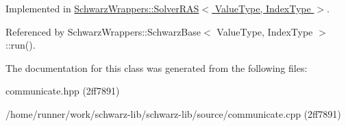 Implemented in \hyperlink{classSchwarzWrappers_1_1SolverRAS_a1a741b69e1cd7623c6e2d8467aedaa7c}{Schwarz\+Wrappers\+::\+Solver\+R\+A\+S$<$ Value\+Type, Index\+Type $>$}.



Referenced by Schwarz\+Wrappers\+::\+Schwarz\+Base$<$ Value\+Type, Index\+Type $>$\+::run().



The documentation for this class was generated from the following files\+:\begin{DoxyCompactItemize}
\item 
communicate.\+hpp (2ff7891)\item 
/home/runner/work/schwarz-\/lib/schwarz-\/lib/source/communicate.\+cpp (2ff7891)\end{DoxyCompactItemize}
